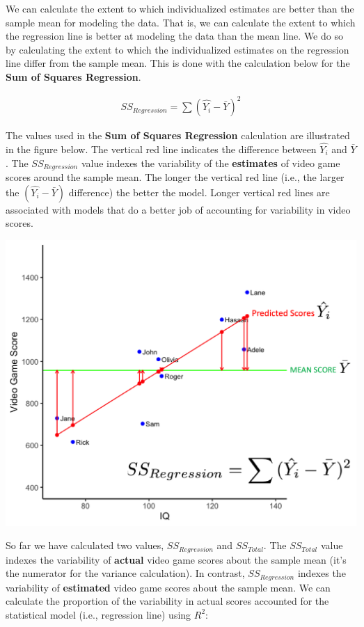\documentclass[
]{krantz}
\begin{document}
We can calculate the extent to which individualized estimates are better than the sample mean for modeling the data. That is, we can calculate the extent to which the regression line is better at modeling the data than the mean line. We do so by calculating the extent to which the individualized estimates on the regression line differ from the sample mean. This is done with the calculation below for the \textbf{Sum of Squares Regression}.

\[
\begin{aligned}
SS_{Regression} = \sum{(\hat{Y_i} - \bar{Y})^2}
\end{aligned}
\]

The values used in the \textbf{Sum of Squares Regression} calculation are illustrated in the figure below. The vertical red line indicates the difference between \(\hat{Y_i}\) and \(\bar{Y}\). The \(SS_{Regression}\) value indexes the variability of the \textbf{estimates} of video game scores around the sample mean. The longer the vertical red line (i.e., the larger the \((\hat{Y_i} - \bar{Y})\) difference) the better the model. Longer vertical red lines are associated with models that do a better job of accounting for variability in video scores.

\includegraphics[width=0.8\linewidth]{ch_correlation/images/sample_plot5}

So far we have calculated two values, \(SS_{Regression}\) and \(SS_{Total}\). The \(SS_{Total}\) value indexes the variability of \textbf{actual} video game scores about the sample mean (it's the numerator for the variance calculation). In contrast, \(SS_{Regression}\) indexes the variability of \textbf{estimated} video game scores about the sample mean. We can calculate the proportion of the variability in actual scores accounted for the statistical model (i.e., regression line) using \(R^2\):
\end{document}
